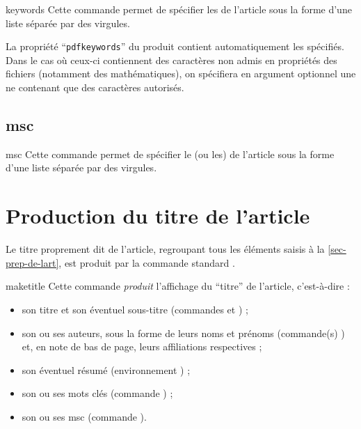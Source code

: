 \documentclass[french,nolocaltoc]{nwejmart}
\newtheorem[title=Fait,style=definition]{fact}
\begin{document}
\begin{docCommand}[doc description=\mandatory]{keywords}{}
  Cette commande permet de spécifier les  de l'article sous la
  forme d'une liste séparée par des virgules.

  La propriété \enquote{\texttt{pdfkeywords}} du  produit contient
  automatiquement les  spécifiés. Dans le cas où ceux-ci
  contiennent des caractères non admis en propriétés des fichiers 
  (notamment des mathématiques), on spécifiera en argument optionnel une
   ne contenant que des caractères autorisés.
\end{docCommand}

\begin{bodycode}[listing options={deletekeywords={[5]keywords}}]
\end{bodycode}

\subsection{\texorpdfstring{\acrfull{msc}}{MSC}}

\begin{docCommand}[doc description=\mandatory]{msc}{}
  Cette commande permet de spécifier le (ou les)  de
  l'article sous la forme d'une liste séparée par des virgules.
\end{docCommand}

\section{Production du titre de l'article}
\label{sec-creation-du-titre}

Le titre proprement dit de l'article, regroupant tous les éléments saisis à la
\vref{sec-prep-de-lart}, est produit par la commande standard
.

\begin{docCommand}[doc description=\mandatory]{maketitle}{}
  Cette commande \emph{produit} l'affichage du \enquote{titre} de l'article,
  c'est-à-dire :
  \begin{itemize}
  \item son titre et son éventuel sous-titre (commandes  et
    ) ;
  \item son ou ses auteurs, sous la forme de leurs noms et prénoms (commande(s)
    ) et, en note de bas de page, leurs affiliations respectives ;
  \item son éventuel résumé (environnement ) ;
  \item son ou ses mots clés (commande ) ;
  \item son ou ses \acrshort{msc} (commande ).
  \end{itemize}
\end{docCommand}
\end{document}
